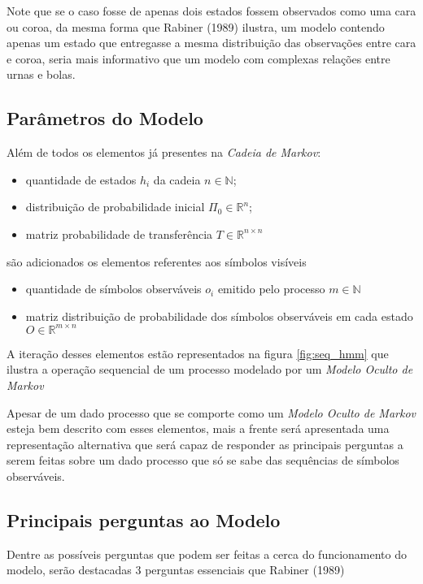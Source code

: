 \documentclass{subfiles}
\begin{document}
Note que se o caso fosse de apenas dois estados fossem observados como uma cara ou coroa, da mesma forma que Rabiner (1989) \autocite{Rabiner:1989tut} ilustra, um modelo contendo apenas um estado que entregasse a mesma distribuição das observações entre cara e coroa, seria mais informativo que um modelo com complexas relações entre urnas e bolas.

\subsection{Parâmetros do Modelo}

Além de todos os elementos já presentes na \textit{Cadeia de Markov}:
\begin{itemize}
    \item quantidade de estados $h_i$ da cadeia $n \in \mathbb{N}$;
    \item distribuição de probabilidade inicial $\Pi_0 \in \mathbb{R}^n$; 
    \item matriz probabilidade de transferência $T \in \mathbb{R}^{n \times n}$
\end{itemize}
são adicionados os elementos referentes aos símbolos visíveis
\begin{itemize}
    \item quantidade de símbolos observáveis $o_i$ emitido pelo processo $m \in \mathbb{N}$
    \item matriz distribuição de probabilidade dos símbolos observáveis em cada estado $O \in \mathbb{R}^{m \times n}$
\end{itemize}
A iteração desses elementos estão representados na figura \ref{fig:seq_hmm} que ilustra a operação sequencial de um processo modelado por um \textit{Modelo Oculto de Markov}

Apesar de um dado processo que se comporte como um \textit{Modelo Oculto de Markov} esteja bem descrito com esses elementos, mais a frente será apresentada uma representação alternativa que será capaz de responder as principais perguntas a serem feitas sobre um dado processo que só se sabe das sequências de símbolos observáveis.

\subsection{Principais perguntas ao Modelo}

Dentre as possíveis perguntas que podem ser feitas a cerca do funcionamento do modelo, serão destacadas 3 perguntas essenciais que Rabiner (1989) \autocite{Rabiner:1989tut}
\end{document}
